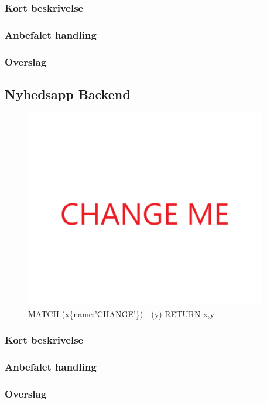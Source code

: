 \documentclass{article}
\begin{document}
\subsubsection{Kort beskrivelse}
\subsubsection{Anbefalet handling}
\subsubsection{Overslag}


\subsection{Nyhedsapp Backend}
\begin{figure}[h]
\includegraphics[width=300pt]{CHANGE.PNG}
\caption{MATCH (x\{name:'CHANGE'\})- -(y) RETURN x,y}
\end{figure}
\subsubsection{Kort beskrivelse}
\subsubsection{Anbefalet handling}
\subsubsection{Overslag}
\end{document}

